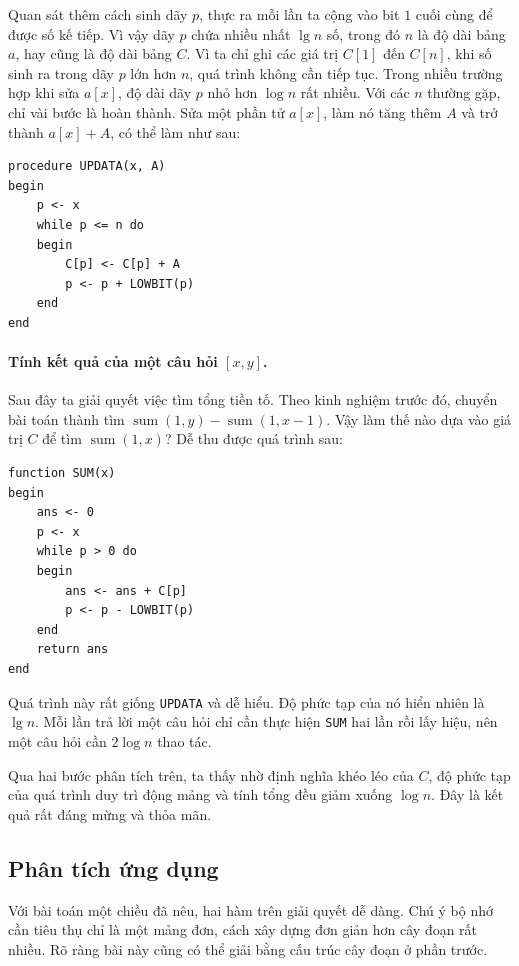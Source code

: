 \documentclass[11pt]{article}
\begin{document}
Quan sát thêm cách sinh dãy \(p\), thực ra mỗi lần ta cộng vào bit \(1\) cuối
cùng để được số kế tiếp. Vì vậy dãy \(p\) chứa nhiều nhất \(\lg n\) số, trong
đó \(n\) là độ dài bảng \(a\), hay cũng là độ dài bảng \(C\). Vì ta chỉ ghi
các giá trị \(C[1]\) đến \(C[n]\), khi số sinh ra trong dãy \(p\) lớn hơn
\(n\), quá trình không cần tiếp tục. Trong nhiều trường hợp khi sửa \(a[x]\),
độ dài dãy \(p\) nhỏ hơn \(\log n\) rất nhiều. Với các \(n\) thường gặp, chỉ
vài bước là hoàn thành. Sửa một phần tử \(a[x]\), làm nó tăng thêm \(A\) và
trở thành \(a[x]+A\), có thể làm như sau:

\begin{verbatim}
procedure UPDATA(x, A)
begin
    p <- x
    while p <= n do
    begin
        C[p] <- C[p] + A
        p <- p + LOWBIT(p)
    end
end
\end{verbatim}

\paragraph{Tính kết quả của một câu hỏi \([x,y]\).}
Sau đây ta giải quyết việc tìm tổng tiền tố. Theo kinh nghiệm trước đó, chuyển
bài toán thành tìm \(\operatorname{sum}(1,y)-\operatorname{sum}(1,x-1)\). Vậy
làm thế nào dựa vào giá trị \(C\) để tìm \(\operatorname{sum}(1,x)\)? Dễ thu
được quá trình sau:

\begin{verbatim}
function SUM(x)
begin
    ans <- 0
    p <- x
    while p > 0 do
    begin
        ans <- ans + C[p]
        p <- p - LOWBIT(p)
    end
    return ans
end
\end{verbatim}

Quá trình này rất giống \texttt{UPDATA} và dễ hiểu. Độ phức tạp của nó hiển
nhiên là \(\lg n\). Mỗi lần trả lời một câu hỏi chỉ cần thực hiện
\texttt{SUM} hai lần rồi lấy hiệu, nên một câu hỏi cần \(2\log n\) thao tác.

Qua hai bước phân tích trên, ta thấy nhờ định nghĩa khéo léo của \(C\), độ
phức tạp của quá trình duy trì động mảng và tính tổng đều giảm xuống
\(\log n\). Đây là kết quả rất đáng mừng và thỏa mãn.

\subsection{Phân tích ứng dụng}

Với bài toán một chiều đã nêu, hai hàm trên giải quyết dễ dàng. Chú ý bộ nhớ
cần tiêu thụ chỉ là một mảng đơn, cách xây dựng đơn giản hơn cây đoạn rất
nhiều. Rõ ràng bài này cũng có thể giải bằng cấu trúc cây đoạn ở phần trước.
\end{document}
